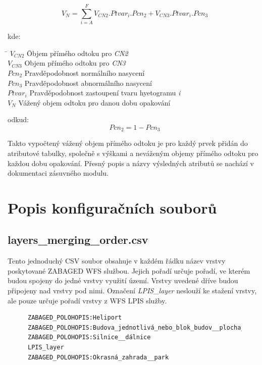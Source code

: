 \documentclass[a4paper,oneside,12pt]{book}
\begin{document}
\begin{equation}
V_{N} = \sum_{i = A}^{F} \mathit{V}_{CN2} . Ptvar_{i} . Pcn_{2} + \mathit{V}_{CN3} . Ptvar_{i} . Pcn_{3}
\end{equation}

kde:
\begin{tabbing}
    \hspace{10mm} \= $\mathit{V}_{CN2}$ \hspace{5mm} \= Objem přímého odtoku pro \textit{CN2} \\
    \> $\mathit{V}_{CN3}$ \> Objem přímého odtoku pro \textit{CN3} \\ 
    \> $Pcn_{2}$  \> Pravděpodobnost normálního nasycení \\
    \> $Pcn_{3}$ \> Pravděpodobnost abnormálního nasycení \\
    \> $Ptvar_{i}$ \> Pravděpodobnost zastoupení tvaru hyetogramu \textit{i} \\
    \> $V_{N}$ \> Vážený objem odtoku pro danou dobu opakování 
\end{tabbing}
odkud: 
\begin{equation}
Pcn_{2} = 1 -  Pcn_{3}
\end{equation}

\hspace{10mm} Takto vypočtený vážený objem přímého odtoku je pro každý prvek přidán do atributové tabulky, společně s výškami a neváženým objemy přímého odtoku  pro každou dobu opakování. Přesný popis a názvy výsledných atributů se nachází v dokumentaci zásuvného modulu. %

\section{Popis konfiguračních souborů} \label{config}
\subsection*{layers\_merging\_order.csv} \label{layers_merging_order.csv}
\hspace{10mm}Tento jednoduchý CSV soubor obsahuje v každém řádku název vrstvy poskytované ZABAGED WFS službou. Jejich pořadí určuje pořadí, ve kterém budou spojeny do jedné vrstvy využití území. Vrstvy uvedené dříve budou připojeny nad vrstvy pod nimi. Označení \textit{LPIS\_layer} neslouží ke stažení vrstvy, ale pouze určuje pořadí vrstvy z WFS LPIS služby.

\begin{figure}[H]
\begin{lstlisting}[style=mypython, caption={Ukázka layers\_merging\_order.csv},label={kod:layers_merging_order.csv}]
ZABAGED_POLOHOPIS:Heliport
ZABAGED_POLOHOPIS:Budova_jednotlivá_nebo_blok_budov__plocha_
ZABAGED_POLOHOPIS:Silnice__dálnice
LPIS_layer
ZABAGED_POLOHOPIS:Okrasná_zahrada__park
\end{lstlisting}
\end{figure}
\end{document}
